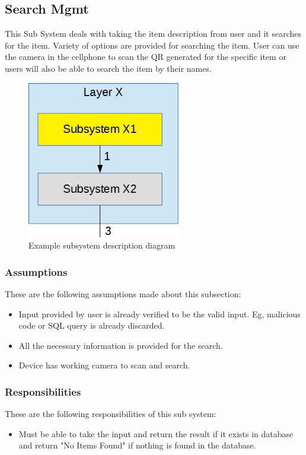 \subsection{Search Mgmt}
This Sub System deals with taking the item description from user and it searches for the item. Variety of options are provided for searching the item. User can use the camera in the cellphone to scan the QR generated for the specific item or users will also be able to search the item by their names.

\begin{figure}[h!]
	\centering
 	\includegraphics[width=0.60\textwidth]{images/subsystem}
 \caption{Example subsystem description diagram}
\end{figure}

\subsubsection{Assumptions}
These are the following assumptions made about this subsection:
\begin{itemize}
    \item Input provided by user is already verified to be the valid input. Eg, malicious code or SQL query is already discarded.
    \item All the necessary information is provided for the search. 
    \item Device has working camera to scan and search. 
\end{itemize}

\subsubsection{Responsibilities}
These are the following responsibilities of this sub system:
\begin{itemize}
    \item Must be able to take the input and return the result if it exists in database and return "No Items Found" if nothing is found in the database.
\end{itemize}

